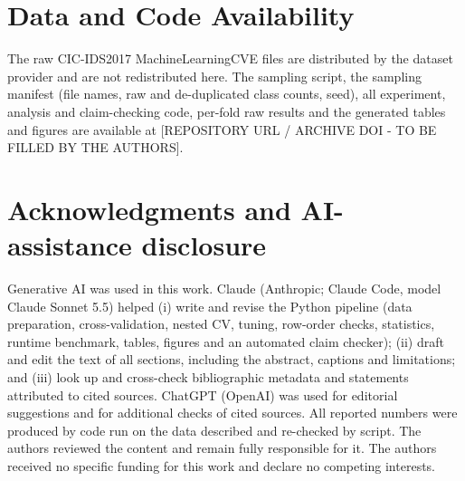 \documentclass[runningheads]{llncs}
\begin{document}
\section*{Data and Code Availability}
The raw CIC-IDS2017 MachineLearningCVE files are distributed by the dataset provider \cite{sharafaldin2018} and are not redistributed here. The sampling script, the sampling manifest (file names, raw and de-duplicated class counts, seed), all experiment, analysis and claim-checking code, per-fold raw results and the generated tables and figures are available at [REPOSITORY URL / ARCHIVE DOI - TO BE FILLED BY THE AUTHORS].


\section*{Acknowledgments and AI-assistance disclosure}
Generative AI was used in this work. Claude (Anthropic; Claude Code, model Claude Sonnet 5.5) helped (i) write and revise the Python pipeline (data preparation, cross-validation, nested CV, tuning, row-order checks, statistics, runtime benchmark, tables, figures and an automated claim checker); (ii) draft and edit the text of all sections, including the abstract, captions and limitations; and (iii) look up and cross-check bibliographic metadata and statements attributed to cited sources. ChatGPT (OpenAI) was used for editorial suggestions and for additional checks of cited sources. All reported numbers were produced by code run on the data described and re-checked by script. The authors reviewed the content and remain fully responsible for it. The authors received no specific funding for this work and declare no competing interests.



\end{document}
